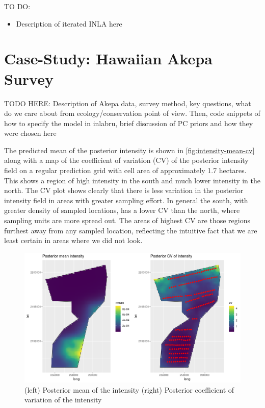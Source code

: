 \documentclass[preprint,12pt]{elsarticle}
\begin{document}
TO DO:

\begin{itemize}
 \item Description of iterated INLA here
\end{itemize}


\newpage

\section*{Case-Study:  Hawaiian Akepa Survey}


TODO HERE:  Description of Akepa data, survey method, key questions, what do we care about from ecology/conservation point of view.  Then, code snippets of how to specify the model in inlabru, brief discussion of PC priors and how they were chosen here

\bigskip

The predicted mean of the posterior intensity is shown in \autoref{fig:intensity-mean-cv} along with a map of the coefficient of variation (CV) of the posterior intensity field on a regular prediction grid with cell area of approximately 1.7 hectares.  This shows a region of high intensity in the south and much lower intensity in the north.  The CV plot shows clearly that there is less variation in the posterior intensity field in areas with greater sampling effort.  In general the south, with greater density of sampled locations, has a lower CV than the north, where sampling units are more spread out.  The areas of highest CV are those regions furthest away from any sampled location, reflecting the intuitive fact that we are least certain in areas where we did not look.   

\begin{figure}
	\includegraphics[scale=0.5]{figures/intensity_mean_cv.png}
	\caption{(left) Posterior mean of the intensity (right) Posterior coefficient of variation of the intensity}
	\label{fig:intensity-mean-cv}
\end{figure}
\end{document}
